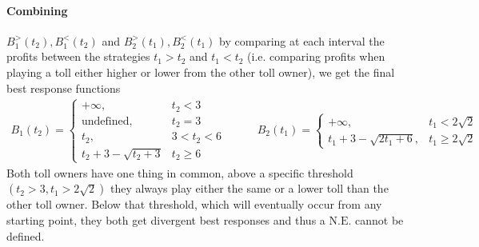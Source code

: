 \documentclass[10pt,a4paper]{book}
\newcommand{\NE}{\mathrm{N.E.}}
\theoremstyle{definition}
\theoremstyle{comment}
\begin{document}
\paragraph{Combining} $B_1^>(t_2), B_1^<(t_2)$ and $B_2^>(t_1), B_2^<(t_1)$ by comparing at each interval the profits between the strategies $t_1 > t_2$ and $t_1 < t_2$ (i.e. comparing profits when playing a toll either higher or lower from the other toll owner), we get the final best response functions
\begin{equation*}
	\begin{aligned}
		B_1(t_2) =
			\begin{cases}
				+\infty, & t_2 < 3 \\
				\textrm{undefined}, & t_2 = 3 \\
				t_2, & 3 < t_2 < 6 \\
				t_2 + 3 - \sqrt{t_2 + 3} & t_2 \ge 6
			\end{cases}
	\end{aligned}
	\qquad
	\begin{aligned}
		B_2(t_1) =
			\begin{cases}
				+\infty, & t_1 < 2 \sqrt{2} \\
				t_1 + 3 - \sqrt{2 t_1 + 6}, & t_1 \ge 2 \sqrt{2}
			\end{cases}
	\end{aligned}
\end{equation*}
Both toll owners have one thing in common, above a specific threshold $(t_2 > 3, t_1 > 2 \sqrt{2})$ they always play either the same or a lower toll than the other toll owner.
Below that threshold, which will eventually occur from any starting point, they both get divergent best responses and thus a $\NE$ cannot be defined.
\end{document}
